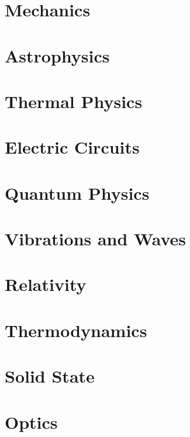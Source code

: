 \documentclass[11pt,titlepage]{article}
\numberwithin{equation}{section}
\begin{document}
\section{Mechanics}
\section{Astrophysics}
\section{Thermal Physics}
\section{Electric Circuits}
\section{Quantum Physics}
\section{Vibrations and Waves}
\section{Relativity}
\section{Thermodynamics}
\section{Solid State}
\section{Optics}
\end{document}
